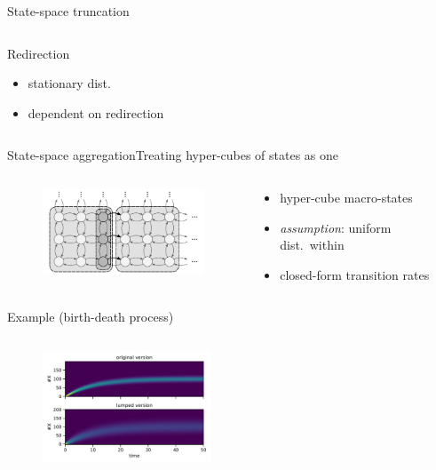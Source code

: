 \documentclass[9pt]{beamer}
\begin{document}
\begin{frame}{State-space truncation}
\begin{columns}
\begin{column}{.30\textwidth}
\begin{block}{Redirection}
                {\small
                \begin{itemize}
                    \item stationary dist.
                    \item dependent on redirection
                \end{itemize}
                }
            \end{block}
        \end{column}
    \end{columns}
\end{frame}

\begin{frame}{State-space aggregation}{Treating hyper-cubes of states as one}
    \begin{columns}
        \begin{column}{.4\textwidth}
            \begin{figure}
            \includegraphics[width=5cm]{../gfx/macro_states.pdf}
            \end{figure}
        \end{column}
        \begin{column}{.6\textwidth}
            \begin{itemize}
                \item hyper-cube macro-states
                \item \emph{assumption}: uniform dist.\ within
                \item closed-form transition rates
            \end{itemize}
        \end{column}
    \end{columns}
    \vspace{3mm}
    \begin{exampleblock}{Example (birth-death process)}
        \begin{columns}
            \begin{column}{.4\textwidth}
                \vspace{-2em}
                \begin{figure}
                    \includegraphics[width=50mm]{../gfx/lumpedvorig.pdf}

\end{figure}
\end{column}
\end{columns}
\end{exampleblock}
\end{frame}
\end{document}
